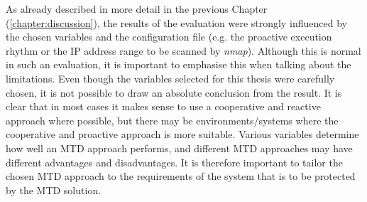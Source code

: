 As already described in more detail in the previous Chapter (\ref{chapter:discussion}), the results of the evaluation were strongly influenced by the chosen variables and the configuration file (e.g. the proactive execution rhythm or the IP address range to be scanned by \textit{nmap}). Although this is normal in such an evaluation, it is important to emphasise this when talking about the limitations. Even though the variables selected for this thesis were carefully chosen, it is not possible to draw an absolute conclusion from the result. It is clear that in most cases it makes sense to use a cooperative and reactive approach where possible, but there may be environments/systems where the  cooperative and proactive approach is more suitable. Various variables determine how well an MTD approach performs, and different MTD approaches may have different advantages and disadvantages. It is therefore important to tailor the chosen MTD approach to the requirements of the system that is to be protected by the MTD solution.


